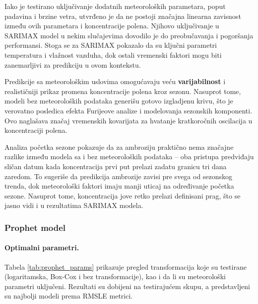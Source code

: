 \documentclass[12pt]{article}
\begin{document}
Iako je testirano uključivanje dodatnih meteoroloških parametara, poput padavina i brzine vetra, utvrđeno je da ne postoji značajna linearna zavisnost između ovih parametara i koncentracije polena. Njihovo uključivanje u SARIMAX model u nekim slučajevima dovodilo je do preobučavanja i pogoršanja performansi. Stoga se za SARIMAX pokazalo da su ključni parametri temperatura i vlažnost vazduha, dok ostali vremenski faktori mogu biti zanemarljivi za predikciju u ovom kontekstu.  

Predikcije sa meteorološkim uslovima omogućavaju veću \textbf{varijabilnost} i realističniji prikaz promena koncentracije polena kroz sezonu. Nasuprot tome, modeli bez meteoroloških podataka generišu gotovo izgladjenu krivu, što je verovatno posledica efekta Furijeove analize i modelovanja sezonskih komponenti. Ovo naglašava značaj vremenskih kovarijata za hvatanje kratkoročnih oscilacija u koncentraciji polena.  

Analiza početka sezone pokazuje da za ambroziju praktično nema značajne razlike između modela sa i bez meteoroloških podataka – oba pristupa predviđaju sličan datum kada koncentracija prvi put prelazi zadatu granicu tri dana zaredom. To sugeriše da predikcija ambrozije zavisi pre svega od sezonskog trenda, dok meteorološki faktori imaju manji uticaj na određivanje početka sezone. Nasuprot tome, koncentracija jove retko prelazi definisani prag, što se jasno vidi i u rezultatima SARIMAX modela.

\subsubsection{Prophet model}
  
\paragraph{\textbf{Optimalni parametri.}}  
Tabela \ref{tab:prophet_params} prikazuje pregled transformacija koje su testirane (logaritamska, Box-Cox i bez transformacije), kao i da li su meteorološki parametri uključeni. Rezultati su dobijeni na testirajućem skupu, a predstavljeni su najbolji modeli prema RMSLE metrici.  
\end{document}
